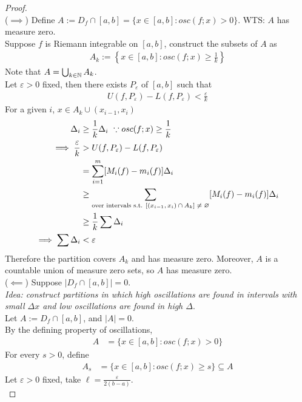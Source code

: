 \documentclass[11pt]{article}
\begin{document}
	\begin{proof}
		\quad \\ ($\implies$)
		Define $A := D_f \cap [a, b] = \{x \in [a, b]: osc(f;x) > 0\}$. WTS: $A$ has measure zero.\\
		Suppose $f$ is Riemann integrable on $[a, b]$, construct the subsets of $A$ as 
		\begin{align}
			A_k := \left\{x \in [a, b]: osc(f;x) \geq \frac{1}{k} \right\}
		\end{align}
		Note that $A = \bigcup_{k \in \mathbb{N}} A_k$. \\
		Let $\varepsilon > 0$ fixed, then there exists $P_\varepsilon$ of $[a, b]$ such that
		\begin{align}
			U(f, P_\varepsilon) - L(f, P_\varepsilon) < \frac{\varepsilon}{k}
		\end{align}
		For a given $i$, $x \in A_k \cup (x_{i-1}, x_i)$
		\begin{align}
			[M_i(f) - m_i(f)] \Delta_i &\geq \frac{1}{k} \Delta_i\ \because osc(f;x) \geq \frac{1}{k} \\
			\implies \frac{\varepsilon}{k} &> U(f, P_\varepsilon) - L(f, P_\varepsilon) \\
			&= \sum_{i=1}^m [M_i(f) - m_i(f)] \Delta_i \\
			&\geq \sum_\tx{over intervals s.t. $[(x_{i-1}, x_i) \cap A_k] \neq \varnothing$} [M_i(f) - m_i(f)] \Delta_i \\
			&\geq \frac{1}{k} \sum \Delta_i \\
			\implies \sum \Delta_i &< \varepsilon
		\end{align}
		Therefore the partition covers $A_k$ and has measure zero. Moreover, $A$ is a countable union of measure zero sets, so $A$ has measure zero. \\
		($\impliedby$) Suppose $|D_f \cap [a,b]| = 0$. \\
		\emph{Idea: construct partitions in which high oscillations are found in intervals with small $\Delta x$ and low oscillations are found in high $\Delta$}. \\
		Let $A := D_f \cap [a, b]$, and $|A| = 0$. \\
		By the defining property of oscillations,
		\begin{align}
			A &= \{x \in [a, b]: osc(f; x) > 0\}
		\end{align}
		For every $s > 0$, define
		\begin{align}
			A_s &= \{x \in [a, b]: osc(f; x) \geq s\} \subseteq A
		\end{align}
		Let $\varepsilon > 0$ fixed, take $\ell = \frac{\varepsilon}{2(b-a)}$. \\

\end{proof}
\end{document}
